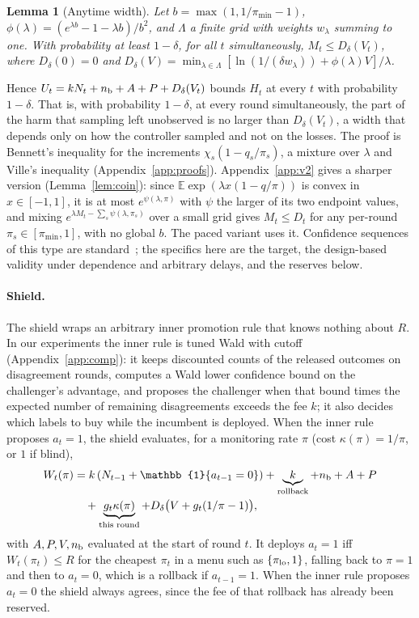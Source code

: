\documentclass[10pt]{article}
\theoremstyle{plain}
\newtheorem{lemma}{Lemma}
\theoremstyle{definition}
\newcommand{\E}{\mathbb{E}}
\newcommand{\one}{\mathbb{1}}
\begin{document}
\begin{lemma}[Anytime width]\label{lem:bennett}
Let $b=\max(1,1/\pi_{\min}-1)$, $\phi(\lambda)=(e^{\lambda b}-1-\lambda b)/b^2$, and $\Lambda$ a finite grid with weights $w_\lambda$ summing to one. With probability at least $1-\delta$, for all $t$ simultaneously, $M_t\le D_\delta(V_t)$, where $D_\delta(0)=0$ and $D_\delta(V)=\min_{\lambda\in\Lambda}[\ln(1/(\delta w_\lambda))+\phi(\lambda)V]/\lambda$.
\end{lemma}
Hence $U_t=kN_t+n_{\rm b}+A+P+D_\delta(V_t)$ bounds $H_t$ at every $t$ with probability $1-\delta$. That is, with probability $1-\delta$, at every round simultaneously, the part of the harm that sampling left unobserved is no larger than $D_\delta(V_t)$, a width that depends only on how the controller sampled and not on the losses. The proof is Bennett's inequality for the increments $\chi_s(1-q_s/\pi_s)$, a mixture over $\lambda$ and Ville's inequality (Appendix~\ref{app:proofs}). Appendix~\ref{app:v2} gives a sharper version (Lemma~\ref{lem:coin}): since $\E\exp(\lambda x(1-q/\pi))$ is convex in $x\in[-1,1]$, it is at most $e^{\psi(\lambda,\pi)}$ with $\psi$ the larger of its two endpoint values, and mixing $e^{\lambda M_t-\sum_s\psi(\lambda,\pi_s)}$ over a small grid gives $M_t\le D_t$ for any per-round $\pi_s\in[\pi_{\min},1]$, with no global $b$. The paced variant uses it. Confidence sequences of this type are standard~\citep{howard2021time,waudbysmith2024betting}; the specifics here are the target, the design-based validity under dependence and arbitrary delays, and the reserves below.

\paragraph{Shield.}
The shield wraps an arbitrary inner promotion rule that knows nothing about $R$. In our experiments the inner rule is tuned Wald with cutoff (Appendix~\ref{app:comp}): it keeps discounted counts of the released outcomes on disagreement rounds, computes a Wald lower confidence bound on the challenger's advantage, and proposes the challenger when that bound times the expected number of remaining disagreements exceeds the fee $k$; it also decides which labels to buy while the incumbent is deployed. When the inner rule proposes $a_t=1$, the shield evaluates, for a monitoring rate $\pi$ (cost $\kappa(\pi)=1/\pi$, or $1$ if blind),
{\small\begin{align*}
W_t(\pi)&=k\,(N_{t-1}+\one\{a_{t-1}=0\})+\underbrace{k}_{\text{rollback}}+n_{\rm b}+A+P\\
&\quad+\underbrace{g_t\kappa(\pi)}_{\text{this round}}+D_\delta\big(V+g_t(1/\pi-1)\big),
\end{align*}}
with $A,P,V,n_{\rm b}$ evaluated at the start of round $t$. It deploys $a_t=1$ iff $W_t(\pi_t)\le R$ for the cheapest $\pi_t$ in a menu such as $\{\pi_{\rm lo},1\}$, falling back to $\pi=1$ and then to $a_t=0$, which is a rollback if $a_{t-1}=1$. When the inner rule proposes $a_t=0$ the shield always agrees, since the fee of that rollback has already been reserved.
\end{document}
